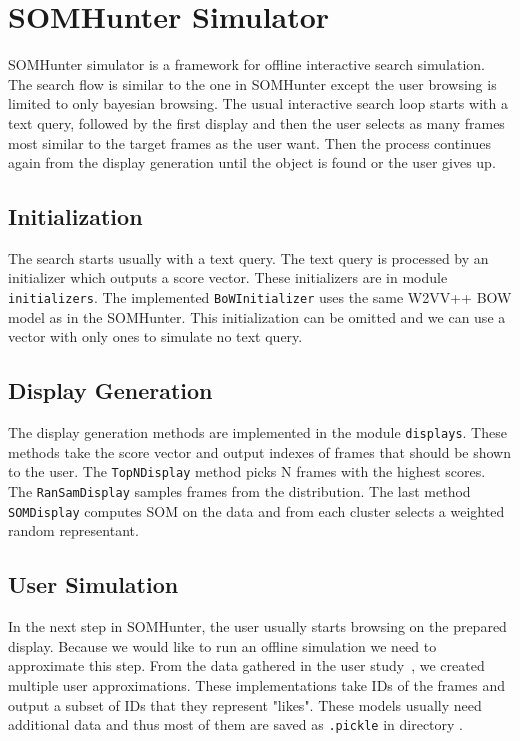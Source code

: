 \chapter{SOMHunter Simulator}
\label{somhunter-simulator}


SOMHunter simulator is a framework for offline interactive search simulation. The search flow is similar to the one in SOMHunter except the user browsing is limited to only bayesian browsing. The usual interactive search loop starts with a text query, followed by the first display and then the user selects as many frames most similar to the target frames as the user want. Then the process continues again from the display generation until the object is found or the user gives up.

\section{Initialization}

The search starts usually with a text query. The text query is processed by an initializer which outputs a score vector. These initializers are in module \lstinline{initializers}. The implemented \lstinline{BoWInitializer} uses the same W2VV++ BOW model as in the SOMHunter. This initialization can be omitted and we can use a vector with only ones to simulate no text query.

\section{Display Generation}

The display generation methods are implemented in the module \lstinline{displays}. These methods take the score vector and output indexes of frames that should be shown to the user. The \lstinline{TopNDisplay} method picks N frames with the highest scores. The \lstinline{RanSamDisplay} samples frames from the distribution. The last method \lstinline{SOMDisplay} computes SOM on the data and from each cluster selects a weighted random representant. 

\section{User Simulation}

In the next step in SOMHunter, the user usually starts browsing on the prepared display. Because we would like to run an offline simulation we need to approximate this step. From the data gathered in the user study~\cite{peska2021}, we created multiple user approximations. These implementations take IDs of the frames and output a subset of IDs that they represent "likes". These models usually need additional data and thus most of them are saved as \lstinline{.pickle} in directory .

